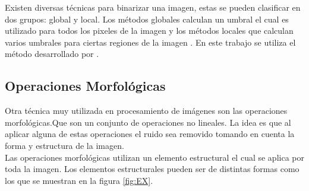Existen diversas técnicas para binarizar una imagen, estas se pueden clasificar en dos grupos: global y local. Los métodos globales calculan un umbral el cual es utilizado para todos los pixeles de la imagen y los métodos locales que calculan varios umbrales para ciertas regiones de la imagen \citep{Chaki2014}.  En este trabajo se utiliza el método desarrollado por \citep{Otsu1979}.

\subsection{Operaciones Morfológicas}\label{subsec:OperacionesMorfologicas} 

Otra técnica muy utilizada en procesamiento de imágenes son las operaciones morfológicas.Que son un conjunto de operaciones no lineales. La idea es que al aplicar alguna de estas operaciones el ruido sea removido tomando en cuenta la forma y estructura de la imagen.\\ 
Las operaciones morfológicas \citep{Premaratne2013} utilizan un elemento estructural el cual se aplica por toda la imagen. Los elementos estructurales pueden ser de distintas formas como los que se muestran en la figura \ref{fig:EX}.
